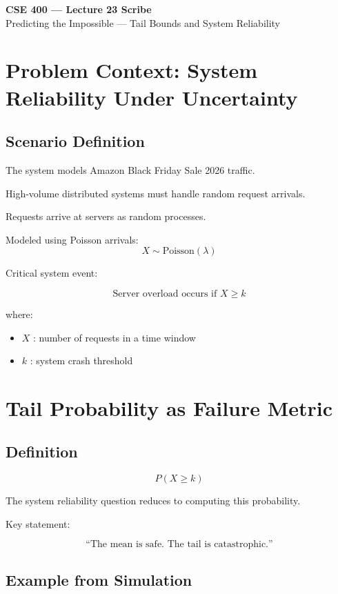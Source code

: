 \documentclass[11pt]{article}
\begin{document}
\begin{center}
{\Large \textbf{CSE 400 — Lecture 23 Scribe}}\\
\vspace{0.2em}
Predicting the Impossible — Tail Bounds and System Reliability
\end{center}

\section{Problem Context: System Reliability Under Uncertainty}

\subsection{Scenario Definition}

The system models Amazon Black Friday Sale 2026 traffic.

High-volume distributed systems must handle random request arrivals.

Requests arrive at servers as random processes.

Modeled using Poisson arrivals:
\[
X \sim \text{Poisson}(\lambda)
\]

Critical system event:

\[
\text{Server overload occurs if } X \ge k
\]

where:
\begin{itemize}[noitemsep]
\item $X$ : number of requests in a time window
\item $k$ : system crash threshold
\end{itemize}

\section{Tail Probability as Failure Metric}

\subsection{Definition}

\[
P(X \ge k)
\]

The system reliability question reduces to computing this probability.

Key statement:

\[
\text{“The mean is safe. The tail is catastrophic.”}
\]

\subsection{Example from Simulation}
\end{document}

